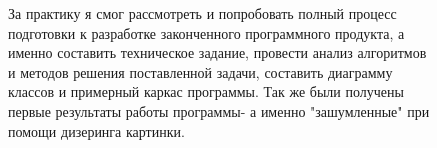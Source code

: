 \Conclusion %

\begin{figure}
	За практику я смог рассмотреть и попробовать полный процесс подготовки к разработке законченного программного продукта, а именно составить техническое задание, провести анализ алгоритмов и методов решения поставленной задачи, составить диаграмму классов и примерный каркас программы. Так же были получены первые результаты работы программы- а именно "зашумленные" при помощи дизеринга картинки.
\end{figure}
